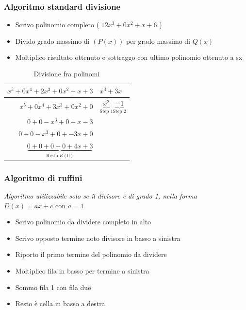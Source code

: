 \subsubsection{Algoritmo standard divisione}

\begin{itemize}
	\item Scrivo polinomio completo ( $12x^3 + 0 x^2 + x + 6$ )
	\item Divido grado massimo di $\left( P\left( x \right)  \right) $ per grado massimo di $Q\left( x \right) $
	\item Moltiplico risultato ottenuto e sottraggo con ultimo polinomio ottenuto a sx
\end{itemize}
\begin{table}[H]
	\centering
	\caption{Divisione fra polinomi}
	\label{tab:label}
	\begin{tabular}{r|l}
		$ x^{5} + 0 x^{4}+ 2x^{3} + 0 x^{2} + x + 3$ & $x^{3}+ 3x$                                                           \\
		\hline
		$ x^{5} + 0 x^{4}+ 3x^{3} + 0 x^{2} +0 $     & $ \underbrace{x^{2}}_{\text{Step 1}} \underbrace{-1}_{\text{Step 2}}$ \\
		$ 0 + 0 - x^{3} + 0 + x - 3$                 &                                                                       \\
		$ 0 + 0 - x^{3} + 0 + -3x + 0$               &                                                                       \\
		$ \underbrace{0+0+0+0+4x+3}_{\text{Resto } R\left( 0 \right) } $
	\end{tabular}
\end{table}

\subsubsection{Algoritmo di ruffini}
\label{sec:algoritmodiruffini}
\textit{Algoritmo utilizzabile solo se il divisore è di grado 1, nella forma} $D\left( x \right) = ax + c \text{ con } a = 1$
\begin{itemize}
	\item Scrivo polinomio da dividere completo in alto
	\item Scrivo opposto termine noto divisore in basso a sinistra
	\item Riporto il primo termine del polinomio da dividere
	\item Moltiplico fila in basso per termine a sinistra
	\item Sommo fila 1 con fila due
	\item Resto è cella in basso a destra
\end{itemize}

